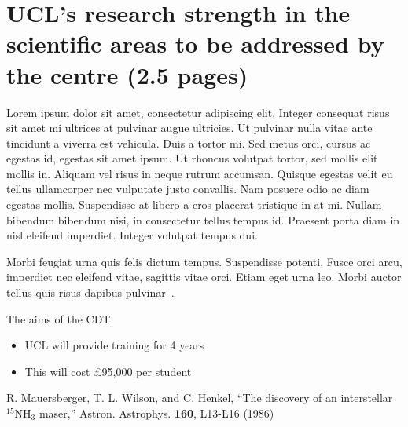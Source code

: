 \documentclass[a4paper,onecolumn,11pt]{article}
\begin{document}
\section*{UCL's research strength in the scientific areas to be addressed by the centre (2.5 pages)}

 Lorem ipsum dolor sit amet, consectetur adipiscing elit. Integer consequat risus sit amet mi ultrices at pulvinar augue ultricies. Ut pulvinar nulla vitae ante tincidunt a viverra est vehicula. Duis a tortor mi. Sed metus orci, cursus ac egestas id, egestas sit amet ipsum. Ut rhoncus volutpat tortor, sed mollis elit mollis in. Aliquam vel risus in neque rutrum accumsan. Quisque egestas velit eu tellus ullamcorper nec vulputate justo convallis. Nam posuere odio ac diam egestas mollis. Suspendisse at libero a eros placerat tristique in at mi. Nullam bibendum bibendum nisi, in consectetur tellus tempus id. Praesent porta diam in nisl eleifend imperdiet. Integer volutpat tempus dui.

 Morbi feugiat urna quis felis dictum tempus. Suspendisse potenti. Fusce orci arcu, imperdiet nec eleifend vitae, sagittis vitae orci. Etiam eget urna leo. Morbi auctor tellus quis risus dapibus pulvinar~\citep{Mauersberger:1986}.

 The aims of the CDT: 
\begin{itemize}
\item UCL will provide training for 4 years
\item This will cost \pounds 95,000 per student
\end{itemize}

%
%
\begin{thebibliography}{1}
R. Mauersberger, T. L. Wilson, and C. Henkel,
``The discovery of an interstellar $^{15}$NH$_3$ maser,''
Astron. Astrophys. {\bf 160}, L13-L16 (1986)
\end{thebibliography}
\end{document}

